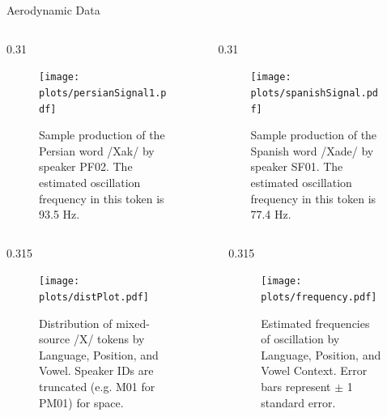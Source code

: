 \documentclass[final]{beamer}
\newlength{\sepwid}
\newlength{\twocolwid}
\begin{document}
\begin{frame}[t]
\begin{columns}[t]
\begin{column}{\twocolwid}
\begin{block}{Aerodynamic Data}
\begin{columns}[t,totalwidth=\twocolwid]
\begin{column}{0.31\twocolwid}
\begin{figure}
\texttt{[image: plots/persianSignal1.pdf]}
\caption{Sample production of the Persian word /Xa\textlengthmark k/ by speaker PF02. The estimated oscillation frequency in this token is 93.5 Hz.}
\end{figure}

\end{column}

\begin{column}{0.31\twocolwid} %

\begin{figure}
\texttt{[image: plots/spanishSignal.pdf]}
\caption{Sample production of the Spanish word /Xade/ by speaker SF01. The estimated oscillation frequency in this token is 77.4 Hz.}
\end{figure}

\end{column}

\end{columns} %


\begin{column}{\sepwid}\end{column} %


\begin{columns}[t,totalwidth=\twocolwid] %

\begin{column}{0.315\twocolwid} %

\begin{figure}
\texttt{[image: plots/distPlot.pdf]}
\caption{Distribution of mixed-source /X/ tokens by Language, Position, and Vowel. Speaker IDs are truncated (e.g. M01 for PM01) for space.}
\end{figure}

\end{column} %

\begin{column}{0.315\twocolwid} %

\begin{figure}
\texttt{[image: plots/frequency.pdf]}
\caption{Estimated frequencies of oscillation by Language, Position, and Vowel Context. Error bars represent $\pm$ 1 standard error.}
\end{figure}


\end{column}
\end{columns}
\end{block}
\end{column}
\end{columns}
\end{frame}
\end{document}
